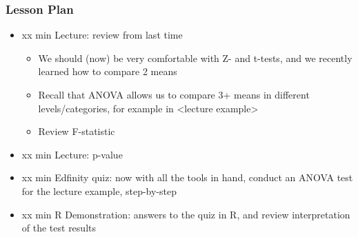 \begin{frame}
    \frametitle{Lesson Plan}
    \begin{itemize}
        \item xx min Lecture: review from last time
        \begin{itemize}
            \item We should (now) be very comfortable with Z- and t-tests, and we recently learned how to compare 2 means
            \item Recall that ANOVA allows us to compare 3+ means in different levels/categories, for example in <lecture example>
            \item Review F-statistic
        \end{itemize}
        \item xx min Lecture: p-value
        \item xx min Edfinity quiz: now with all the tools in hand, conduct an ANOVA test for the lecture example, step-by-step
        \item xx min R Demonstration: answers to the quiz in R, and review interpretation of the test results
    \end{itemize}
\end{frame}

